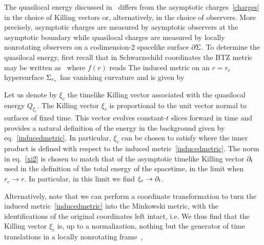 \documentclass[11pt,a4paper,utf8]{article}
\renewcommand{\tilde}[1]{\ensuremath{\widetilde{#1}}}
\begin{document}
	The quasilocal energy discussed in~\cite{Brown:1994gs} differs from the asymptotic charges~\eqref{charges} in the choice of Killing vectors or, alternatively, in the choice of observers. More precisely, asymptotic charges are measured by asymptotic observers at the asymptotic boundary while quasilocal charges are measured by locally nonrotating observers on a codimension-2 spacelike surface $\p\Sigma$. To determine the quasilocal energy, first recall that in Schwarzschild coordinates the BTZ metric may be written as~\cite{Banados:1992wn}
	where $f(r)$ reads
	The induced metric on an $r = r_c$ hypersurface $\ss_{r_c}$ has vanishing curvature and is given by
	
	Let us denote by $\xi_c$ the timelike Killing vector associated with the quasilocal energy $Q_{\xi_c}$. The Killing vector $\xi_c$ is proportional to the unit vector normal to surfaces of fixed time. This vector evolves constant-$t$ slices forward in time and provides a natural definition of the energy in the background given by eq.~\eqref{inducedmetric}. In particular, $\xi_c$ can be chosen to satisfy 
	where the inner product is defined with respect to the induced metric~\eqref{inducedmetric}. The norm in eq.~\eqref{xi2} is chosen to match that of the asymptotic timelike Killing vector $\p_t$ used in the definition of the total energy of the spacetime, in the limit when $r_c \to r$. In particular, in this limit we find $\xi_c \to \p_t$.
	
	Alternatively, note that we can perform a coordinate transformation 
	to turn the induced metric~\eqref{inducedmetric} into the Minkowski metric,
	with the identifications of the original coordinates left intact, i.e.
	  \eq{
	  (\til{t},\,\til{\phi}) \sim (\tilde{t},\,\til{\phi} + 2 \pi).
	  }
	We thus find that the Killing vector $\xi_c$ is, up to a normalization, nothing but the generator of time translations in a locally nonrotating frame~\cite{Misner:1974qy},
	  \eq{
	  \xi_c  = \frac{r_c}{\sqrt{f(r_c)}} \bigg (\p_t - \frac{4 G J}{r_c^2} \p_{\phi} \bigg ) = \p_{\tilde{t}}. \label{xi1}
	  }
	
\end{document}
